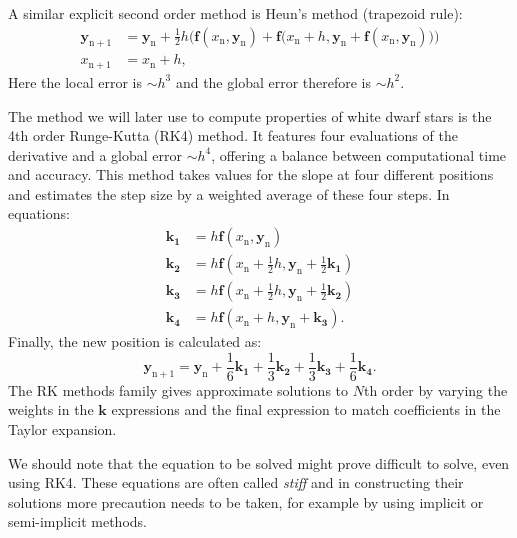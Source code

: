 \documentclass[]{article}
\renewcommand{\vec}[1]{\boldsymbol{#1}}
\begin{document}
	A similar explicit second order method is Heun's method (trapezoid rule):
	\begin{align}
		\vec{y}_\mathrm{n+1} &= \vec{y}_\mathrm{n} + \frac{1}{2} h \Big(\vec{f}(x_\mathrm{n}, \vec{y}_\mathrm{n}) + \vec{f}\big(x_\mathrm{n} + h, \vec{y}_\mathrm{n} + \vec{f}(x_\mathrm{n}, \vec{y}_\mathrm{n})\big)\Big)\\
		x_\mathrm{n+1} &= x_\mathrm{n} + h, \nonumber
	\end{align}
	Here the local error is $\sim h^3$ and the global error therefore is $\sim h^2$.

	The method we will later use to compute properties of white dwarf stars is the 4th order Runge-Kutta (RK4) method. It features four evaluations of the derivative and a global error $\sim h^4$, offering a balance between computational time and accuracy. This method takes values for the slope at four different positions and estimates the step size by a weighted average of these four steps. In equations:
	\begin{align*}
		\vec{k_1} &= h \vec{f}(x_\mathrm{n}, \vec{y}_\mathrm{n})\\
		\vec{k_2} &= h \vec{f}\left(x_\mathrm{n} + \frac{1}{2} h, \vec{y}_\mathrm{n} + \frac{1}{2}\vec{k_1}\right)\\
		\vec{k_3} &= h \vec{f}\left(x_\mathrm{n} + \frac{1}{2} h, \vec{y}_\mathrm{n} + \frac{1}{2}\vec{k_2}\right)\\
		\vec{k_4} &= h \vec{f}(x_\mathrm{n} + h, \vec{y}_\mathrm{n} + \vec{k_3}).
	\end{align*}
	Finally, the new position is calculated as:
	\begin{equation}
		\vec{y}_\mathrm{n+1} = \vec{y}_\mathrm{n} + \frac{1}{6} \vec{k_1} + \frac{1}{3} \vec{k_2} + \frac{1}{3} \vec{k_3} + \frac{1}{6} \vec{k_4}.
	\end{equation}
	The RK methods family gives approximate solutions to $N$th order by varying the weights in the $\vec{k}$ expressions and the final expression to match coefficients in the Taylor expansion.

	We should note that the equation to be solved might prove difficult to solve, even using RK4. These equations are often called \emph{stiff} and in constructing their solutions more precaution needs to be taken, for example by using implicit or semi-implicit methods.
\end{document}
